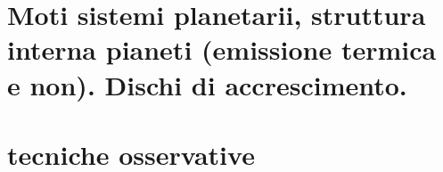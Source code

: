 \documentclass[10pt,xcolor={usenames},fleqn,serif]{beamer}
\begin{document}
\part{Moti sistemi planetarii, struttura interna pianeti (emissione termica e non). Dischi di accrescimento.}\label{part:observables}


\part{tecniche osservative}\label{part:tech}

\end{document}
